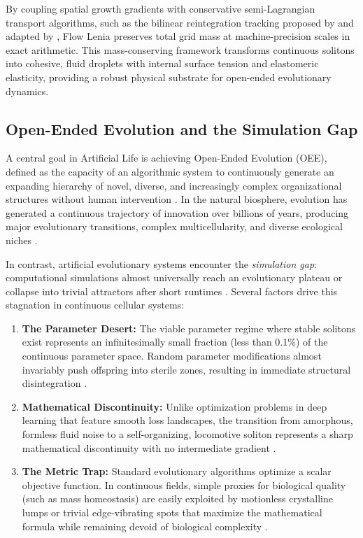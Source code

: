 By coupling spatial growth gradients with conservative semi-Lagrangian transport algorithms, such as the bilinear reintegration tracking proposed by \textcite{moroz2020reintegration} and adapted by \textcite{plantec2025flowlenia}, Flow Lenia preserves total grid mass at machine-precision scales in exact arithmetic. This mass-conserving framework transforms continuous solitons into cohesive, fluid droplets with internal surface tension and elastomeric elasticity, providing a robust physical substrate for open-ended evolutionary dynamics.

\subsection{Open-Ended Evolution and the Simulation Gap}
\label{subsec:bg_oee_simulation_gap}

A central goal in Artificial Life is achieving Open-Ended Evolution (OEE), defined as the capacity of an algorithmic system to continuously generate an expanding hierarchy of novel, diverse, and increasingly complex organizational structures without human intervention \parencite{taylor2016open}. In the natural biosphere, evolution has generated a continuous trajectory of innovation over billions of years, producing major evolutionary transitions, complex multicellularity, and diverse ecological niches \parencite{schrodinger1944what, ruiz2004universal}.

In contrast, artificial evolutionary systems encounter the \textit{simulation gap}: computational simulations almost universally reach an evolutionary plateau or collapse into trivial attractors after short runtimes \parencite{taylor2016open}. Several factors drive this stagnation in continuous cellular systems:
\begin{enumerate}
    \item \textbf{The Parameter Desert:} The viable parameter regime where stable solitons exist represents an infinitesimally small fraction (less than 0.1\%) of the continuous parameter space. Random parameter modifications almost invariably push offspring into sterile zones, resulting in immediate structural disintegration \parencite{plantec2025flowlenia}.
    \item \textbf{Mathematical Discontinuity:} Unlike optimization problems in deep learning that feature smooth loss landscapes, the transition from amorphous, formless fluid noise to a self-organizing, locomotive soliton represents a sharp mathematical discontinuity with no intermediate gradient \parencite{chan2023towards}.
    \item \textbf{The Metric Trap:} Standard evolutionary algorithms optimize a scalar objective function. In continuous fields, simple proxies for biological quality (such as mass homeostasis) are easily exploited by motionless crystalline lumps or trivial edge-vibrating spots that maximize the mathematical formula while remaining devoid of biological complexity \parencite{lehman2011novelty}.
\end{enumerate}

